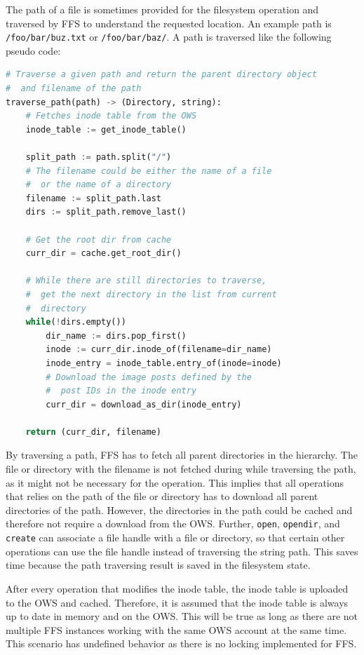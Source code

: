 The path of a file is sometimes provided for the filesystem operation and traversed by FFS to understand the requested location. An example path is \texttt{/foo/bar/buz.txt} or \texttt{/foo/bar/baz/}. A path is traversed like the following pseudo code:
\begin{lstlisting}[language=python, caption={Pseudocode of traversing a given path, returning the \texttt{Directory} and the filename}, label=lst:traverse_path,breaklines=true]
# Traverse a given path and return the parent directory object
#  and filename of the path
traverse_path(path) -> (Directory, string):
	# Fetches inode table from the OWS
	inode_table := get_inode_table()
	
	split_path := path.split("/")
	# The filename could be either the name of a file 
	#  or the name of a directory
	filename := split_path.last
	dirs := split_path.remove_last()

	# Get the root dir from cache
	curr_dir = cache.get_root_dir()

	# While there are still directories to traverse,
	#  get the next directory in the list from current
	#  directory
	while(!dirs.empty())
		dir_name := dirs.pop_first()
		inode := curr_dir.inode_of(filename=dir_name)
		inode_entry = inode_table.entry_of(inode=inode)
		# Download the image posts defined by the 
		#  post IDs in the inode entry
		curr_dir = download_as_dir(inode_entry)
	
	return (curr_dir, filename)

\end{lstlisting}

By traversing a path, FFS has to fetch all parent directories in the hierarchy. The file or directory with the filename is not fetched during while traversing the path, as it might not be necessary for the operation. This implies that all operations that relies on the path of the file or directory has to download all parent directories of the path. However, the directories in the path could be cached and therefore not require a download from the OWS. Further, \texttt{open}, \texttt{opendir}, and \texttt{create} can associate a file handle with a file or directory, so that certain other operations can use the file handle instead of traversing the string path. This saves time because the path traversing result is saved in the filesystem state.

After every operation that modifies the inode table, the inode table is uploaded to the OWS and cached. Therefore, it is assumed that the inode table is always up to date in memory and on the OWS. This will be true as long as there are not multiple FFS instances working with the same OWS account at the same time. This scenario has undefined behavior as there is no locking implemented for FFS.

